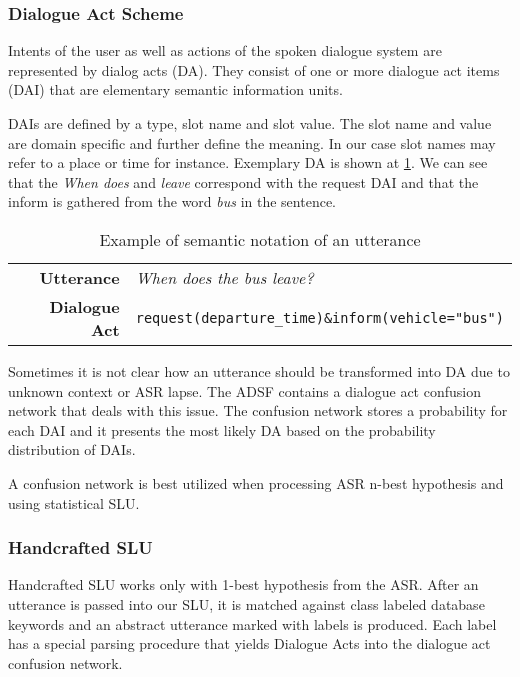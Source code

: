 \subsubsection{Dialogue Act Scheme}

Intents of the user as well as actions of the spoken dialogue system are represented by dialog acts (DA).
They consist of one or more dialogue act items (DAI) that are elementary semantic information units.

DAIs are defined by a type, slot name and slot value.
The slot name and value are domain specific and further define the meaning.
In our case slot names may refer to a place or time for instance.
Exemplary DA is shown at \ref{table:utterance}. We can see that the \textit{When does} and \textit{leave} correspond with the request DAI and that the inform is gathered from the word \textit{bus} in the sentence.

\begin{table}[h]
\centering
\begin{tabular}{ r | l }
	\textbf{Utterance} & \textit{When does the bus leave?} \\
	\textbf{Dialogue Act} & \texttt{request(departure\_time)\&inform(vehicle="bus")}
\end{tabular}
\caption{Example of semantic notation of an utterance}
\label{table:utterance}
\end{table}

Sometimes it is not clear how an utterance should be transformed into DA due to unknown context or ASR lapse.
The ADSF contains a dialogue act confusion network that deals with this issue. %
The confusion network stores a probability for each DAI and it presents the most likely DA based on the probability distribution of DAIs.

A confusion network is best utilized when processing ASR n-best hypothesis and using statistical SLU.

\subsubsection{Handcrafted SLU}

Handcrafted SLU works only with 1-best hypothesis from the ASR.
After an utterance is passed into our SLU, it is matched against class labeled database keywords and an abstract utterance marked with labels is produced.
Each label has a special parsing procedure that yields Dialogue Acts into the dialogue act confusion network.

